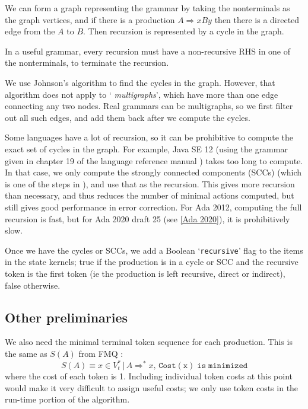 \documentclass{article}
\newcommand{\code}[1]{`\lstinline|#1|'}
\begin{document}
We can form a graph representing the grammar by taking the
nonterminals as the graph vertices, and if there is a production $A
\Rightarrow xBy$ then there is a directed edge from the $A$ to $B$.
Then recursion is represented by a cycle in the graph.

In a useful grammar, every recursion must have a non-recursive
RHS in one of the nonterminals, to terminate the recursion.

We use Johnson's algorithm \cite{graph-cycles} to find the cycles in
the graph. However, that algorithm does not apply to `{\it
  multigraphs}', which have more than one edge connecting any two
nodes. Real grammars can be multigraphs, so we first filter out all
such edges, and add them back after we compute the cycles.

Some languages have a lot of recursion, so it can be prohibitive to
compute the exact set of cycles in the graph. For example, Java SE 12
(using the grammar given in chapter 19 of the language reference
manual \cite{javarm}) takes too long to compute. In that case, we only
compute the strongly connected components (SCCs) (which is one of the
steps in \cite{graph-cycles}), and use that as the recursion. This
gives more recursion than necessary, and thus reduces the number of
minimal actions computed, but still gives good performance in error
correction. For Ada 2012, computing the full recursion is fast, but
for Ada 2020 draft 25 (see \ref{Ada 2020}), it is prohibitively slow.

Once we have the cycles or SCCs, we add a Boolean \code{recursive}
flag to the items in the state kernels; true if the production is in a
cycle or SCC and the recursive token is the first token (ie the
production is left recursive, direct or indirect), false otherwise.

\subsection{Other preliminaries}
We also need the minimal terminal token sequence for each production.
This is the same as $S(A)$ from FMQ \cite{FMQ 1980}:
\begin{equation}
S(A) \equiv x \in V_t^* \, |\, A \Rightarrow^* x, \, \mathtt{Cost(x)\; is\; minimized}
\end{equation}
where the cost of each token is 1. Including individual token costs at
this point would make it very difficult to assign useful costs; we
only use token costs in the run-time portion of the algorithm.
\end{document}
